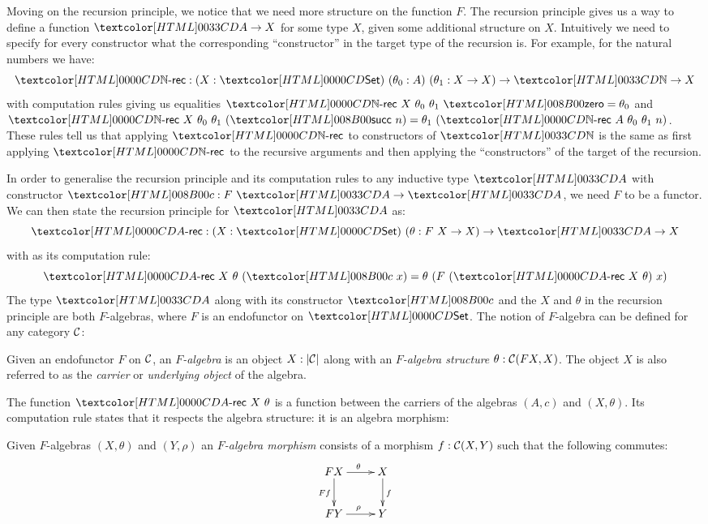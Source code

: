 Moving on the recursion principle, we notice that we need more
structure on the function $F$. The recursion principle gives us a way
to define a function $\Aty \to X$ for some type $X$, given some
additional structure on $X$. Intuitively we need to specify for every
constructor what the corresponding ``constructor'' in the target type
of the recursion is. For example, for the natural numbers we have:
$$
\natrec : (X : \Set)\ (\theta_0 : A)\ (\theta_1 : X \to X) \to \natty \to X
$$
with computation rules giving us equalities
$\natrec\ X\ \theta_0\ \theta_1\ \natzero = \theta_0$ and
$\natrec\ X\ \theta_0\ \theta_1\ (\natsucc\ n) = \theta_1\ (\natrec\
A\ \theta_0\ \theta_1\ n)$.
These rules tell us that applying $\natrec$ to constructors of
$\natty$ is the same as first applying $\natrec$ to the recursive
arguments and then applying the ``constructors'' of the target of the
recursion.

In order to generalise the recursion principle and its computation
rules to any inductive type $\Aty$ with constructor
$\Ac : F\ \Aty \to \Aty$, we need $F$ to be a functor. We can then
state the recursion principle for $\Aty$ as:
$$
\Arec : (X : \Set)\ (\theta : F\ X \to X) \to \Aty \to X
$$
with as its computation rule:
$$
\Arec\ X\ \theta\ (\Ac\ x) = \theta\ (F\ (\Arec\ X\ \theta)\ x)
$$
The type $\Aty$ along with its constructor $\Ac$ and the $X$ and
$\theta$ in the recursion principle are both $F$-algebras, where $F$
is an endofunctor on $\Set$. The notion of $F$-algebra can be defined
for any category $\mathcal{C}$:

\begin{definition}
  Given an endofunctor $F$ on $\mathcal{C}$, an \emph{$F$-algebra} is an
  object $X : | \mathcal{C} |$ along with an \emph{$F$-algebra structure}
  $\theta : \mathcal{C}(F X, X)$. The object $X$ is also referred to as the
  \emph{carrier} or \emph{underlying object} of the algebra.
\end{definition}

The function $\Arec\ X\ \theta$ is a function between the carriers of
the algebras $(A,c)$ and $(X,\theta)$. Its computation rule states
that it respects the algebra structure: it is an algebra morphism:

\begin{definition}
  Given $F$-algebras $(X,\theta)$ and $(Y,\rho)$ an \emph{$F$-algebra
    morphism} consists of a morphism $f : \mathcal{C}(X,Y)$ such that the
  following commutes:
  $$
  \xymatrix{
    FX \ar[r]^{\theta} \ar[d]_{Ff} &X \ar[d]^{f} \\
    FY \ar[r]^{\rho} &Y
  }
  $$
\end{definition}

